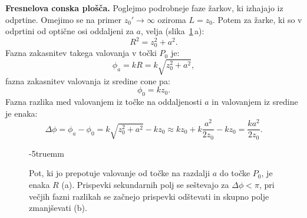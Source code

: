 \begin{example}{\bf Fresnelova conska plošča.}
Poglejmo podrobneje faze žarkov, ki izhajajo iz odprtine. Omejimo se
na primer $z_0' \to \infty$ oziroma $L = z_0$. Potem za žarke, ki so v 
odprtini od optične osi oddaljeni za $a$, velja (slika~\ref{fig:05_FresCona3}\,a):
\begin{equation}
R^2 = z_0^2 + a^2.
\label{eq:05_85}
\end{equation}
Fazna zakasnitev takega valovanja v točki $P_0$ je:
\begin{equation}
\phi_a = kR = k\sqrt{z_0^2+a^2},
\label{eq:05_86}
\end{equation}
fazna zakasnitev valovanja iz sredine cone pa:
\begin{equation}
\phi_0 = kz_0.
\label{eq:05_87}
\end{equation}
Fazna razlika med valovanjem iz točke na oddaljenosti $a$ in valovanjem 
iz sredine je enaka:
\begin{equation}
\Delta \phi = \phi_a - \phi_0 = k\sqrt{z_0^2+a^2} - kz_0 \approx kz_0 + k \frac{a^2}{2z_0} - kz_0 = \frac{ka^2}{2z_0}.
\label{eq:05_87b}
\end{equation}
\begin{figure}[ht]
\centering
\def\svgwidth{120truemm} 

\caption{Pot, ki jo prepotuje valovanje od točke na razdalji $a$ do točke $P_0$, je enaka $R$ (a).
Prispevki sekundarnih polj se seštevajo za $\Delta \phi < \pi$,  pri večjih fazni razlikah
se začnejo prispevki odštevati in skupno polje zmanjševati (b).}
\label{fig:05_FresCona3}
\vglue-5truemm
\end{figure}


\end{example}
